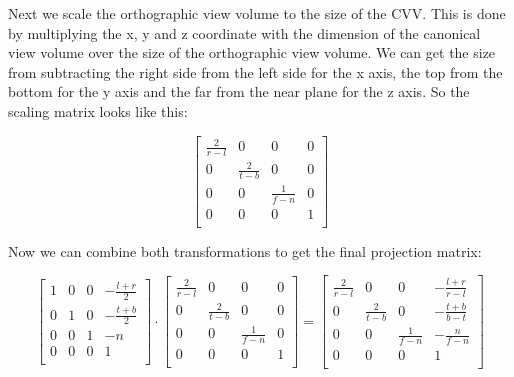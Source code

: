 \documentclass[12pt]{report} \usepackage{preamble}
\begin{document}
Next we scale the orthographic view volume to the size of the CVV. This is done by multiplying the x, y and z coordinate
with the dimension of the canonical view volume over the size of the orthographic view volume.
We can get the size from subtracting the right side from the left side for the x axis,
the top from the bottom for the y axis and the far from the near plane for the z axis. So the scaling matrix looks like this:

\[
	\begin{bmatrix}
		\frac{2}{r - l} & 0               & 0               & 0 \\
		0               & \frac{2}{t - b} & 0               & 0 \\
		0               & 0               & \frac{1}{f - n} & 0 \\
		0               & 0               & 0               & 1 \\
	\end{bmatrix}
\]

Now we can combine both transformations to get the final projection matrix:

\[
	\begin{bmatrix}
		1 & 0 & 0 & -\frac{l + r}{2} \\
		0 & 1 & 0 & -\frac{t + b}{2} \\
		0 & 0 & 1 & -n               \\
		0 & 0 & 0 & 1                \\
	\end{bmatrix}
	\cdot
	\begin{bmatrix}
		\frac{2}{r - l} & 0               & 0               & 0 \\
		0               & \frac{2}{t - b} & 0               & 0 \\
		0               & 0               & \frac{1}{f - n} & 0 \\
		0               & 0               & 0               & 1 \\
	\end{bmatrix}
	=
	\begin{bmatrix}
		\frac{2}{r - l} & 0               & 0               & -\frac{l + r}{r - l} \\
		0               & \frac{2}{t - b} & 0               & -\frac{t + b}{b - t} \\
		0               & 0               & \frac{1}{f - n} & -\frac{n}{f - n}     \\
		0               & 0               & 0               & 1                    \\
	\end{bmatrix}
\]
\end{document}
